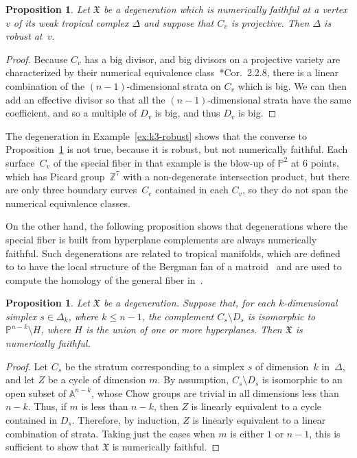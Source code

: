 \documentclass[11pt,reqno]{amsart}
\newtheorem{prop}[thm]{Proposition}
\theoremstyle{definition}
\newcommand{\PP}{\mathbb P}
\newcommand{\X}{\mathfrak X}
\newcommand{\ZZ}{\mathbb Z}
\begin{document}
\begin{prop}\label{p:numerically-faithful-robust}
Let $\X$ be a degeneration which is numerically faithful at a vertex $v$ of its
weak tropical complex $\Delta$ and suppose that $C_v$ is projective. Then
$\Delta$ is robust at~$v$.
\end{prop}

\begin{proof}
Because $C_v$ has a big divisor, and big divisors on a projective variety are
characterized by their numerical equivalence
class~\cite{lazarsfeld}*{Cor.~2.2.8}, there is a linear combination of the
$(n-1)$-dimensional strata on $C_v$ which is big. We can then add an effective
divisor so that all the $(n-1)$-dimensional strata have the same coefficient,
and so a multiple of $D_v$ is big, and thus $D_v$ is big.
\end{proof}

The degeneration in Example~\ref{ex:k3-robust} shows that
the converse to Proposition~\ref{p:numerically-faithful-robust} is not true,
because it is robust, but not numerically faithful.
Each
surface~$C_v$ of the special fiber in that example is the blow-up of $\PP^2$ at
$6$ points, which has Picard group~$\ZZ^7$ with a non-degenerate intersection
product, but there are only three boundary curves~$C_e$ contained in each $C_v$,
so they do not span the numerical equivalence classes.

On the other hand, the following proposition shows that degenerations where the
special fiber is built from hyperplane complements are always numerically
faithful. Such degenerations are related to tropical manifolds, which are defined to
to have the local structure of the Bergman fan of a
matroid~\cites{mikhalkin,jell-rau-shaw,jell-shaw-smacka} and are used to compute
the homology of the general fiber in~\cite{ikmz}.

\begin{prop}\label{p:hyperplane-complement}
Let $\X$ be a degeneration. Suppose that, for each $k$-dimensional simplex
$s \in \Delta_k$, where $k \leq n-1$, the complement $C_s \setminus D_s$ is
isomorphic to $\PP^{n-k} \setminus H$, where $H$ is the union of one or more
hyperplanes. Then $\X$ is numerically faithful.
\end{prop}

\begin{proof}
Let $C_s$ be the stratum corresponding to a simplex $s$ of dimension~$k$
in~$\Delta$, and let $Z$ be a cycle of dimension $m$. By assumption,
$C_s \setminus D_s$ is isomorphic to an open subset of $\mathbb A^{n-k}$, whose
Chow groups are trivial in all dimensions less than $n-k$. Thus, if $m$
is less than $n-k$, then $Z$ is linearly equivalent to a
cycle contained in $D_s$. Therefore, by induction, $Z$ is linearly equivalent to a
linear combination of strata. Taking just the cases when $m$ is either $1$ or
$n-1$, this is sufficient to show that $\X$ is numerically faithful.
\end{proof}
\end{document}
